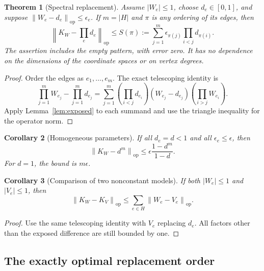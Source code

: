 \documentclass[11pt,a4paper]{article}
\numberwithin{equation}{section}
\newtheorem{theorem}{Theorem}[section]
\newtheorem{corollary}[theorem]{Corollary}
\theoremstyle{definition}
\theoremstyle{remark}
\newcommand{\op}{\mathrm{op}}
\newcommand{\norm}[1]{\left\lVert #1\right\rVert}
\begin{document}
\begin{theorem}[Spectral replacement]
\label{thm:replacement}
Assume $|W_e|\le1$, choose $d_e\in[0,1]$, and suppose
$\norm{W_e-d_e}_{\op}\le\epsilon_e$. If $m=|H|$ and $\pi$ is any
ordering of its edges, then
\begin{equation}
 \boxed{\quad
 \norm{K_W-\prod_e d_e}_{\op}
 \le S(\pi):=\sum_{j=1}^m\epsilon_{\pi(j)}
                    \prod_{i<j}d_{\pi(i)}.\quad}
 \label{eq:replacement}
\end{equation}
The assertion includes the empty pattern, with error zero. It has no
dependence on the dimensions of the coordinate spaces or on vertex
degrees.
\end{theorem}
\begin{proof}
Order the edges as $e_1,\ldots,e_m$. The exact telescoping identity is
\[
 \prod_{j=1}^mW_{e_j}-\prod_{j=1}^md_{e_j}
 =\sum_{j=1}^m\left(\prod_{i<j}d_{e_i}\right)
    (W_{e_j}-d_{e_j})\left(\prod_{i>j}W_{e_i}\right).
\]
Apply Lemma~\ref{lem:exposed} to each summand and use the triangle
inequality for the operator norm.
\end{proof}

\begin{corollary}[Homogeneous parameters]
\label{cor:homogeneous}
If all $d_e=d<1$ and all $\epsilon_e\le\epsilon$, then
\begin{equation}
 \norm{K_W-d^m}_{\op}
 \le\epsilon\frac{1-d^m}{1-d}.
 \label{eq:homogeneous}
\end{equation}
For $d=1$, the bound is $m\epsilon$.
\end{corollary}

\begin{corollary}[Comparison of two nonconstant models]
\label{cor:nonconstant}
If both $|W_e|\le1$ and $|V_e|\le1$, then
\[
 \norm{K_W-K_V}_{\op}
 \le\sum_{e\in H}\norm{W_e-V_e}_{\op}.
\]
\end{corollary}
\begin{proof}
Use the same telescoping identity with $V_e$ replacing $d_e$. All
factors other than the exposed difference are still bounded by one.
\end{proof}

\subsection{The exactly optimal replacement order}
\end{document}
